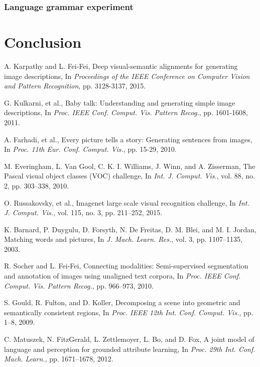 \documentclass[10pt,twocolumn,letterpaper]{article}
\begin{document}
\subsubsection{Language grammar experiment} \label{sec:lg}





\section{Conclusion}


\begin{thebibliography}{99}
A. Karpathy and L. Fei-Fei, Deep visual-semantic alignments for generating image descriptions,
In \textit{Proceedings of the IEEE Conference on Computer Vision and Pattern Recognition}, pp. 3128-3137, 2015.

G. Kulkarni, et al., Baby talk: Understanding and generating simple image descriptions,
In \textit{Proc. IEEE Conf. Comput. Vis. Pattern Recog.}, pp. 1601-1608, 2011.

A. Farhadi, et al., Every picture tells a story: Generating sentences from images,
In \textit{Proc. 11th Eur. Conf. Comput. Vis.}, pp. 15-29, 2010.

M. Everingham, L. Van Gool, C. K. I. Williams, J. Winn, and A. Zisserman, The Pascal visual object classes (VOC) challenge,
In \textit{Int. J. Comput. Vis.}, vol. 88, no. 2, pp. 303–338, 2010.

O. Russakovsky, et al., Imagenet large scale visual recognition challenge,
In \textit{Int. J. Comput. Vis.}, vol. 115, no. 3, pp. 211–252, 2015.

K. Barnard, P. Duygulu, D. Forsyth, N. De Freitas, D. M. Blei, and M. I. Jordan, Matching words and pictures,
In \textit{J. Mach. Learn. Res.}, vol. 3, pp. 1107–1135, 2003.

R. Socher and L. Fei-Fei, Connecting modalities: Semi-supervised segmentation and annotation of images using unaligned text corpora,
In \textit{Proc. IEEE Conf. Comput. Vis. Pattern Recog.}, pp. 966–973, 2010.

S. Gould, R. Fulton, and D. Koller, Decomposing a scene into geometric and semantically consistent regions,
In \textit{Proc. IEEE 12th Int. Conf. Comput. Vis.}, pp. 1–8, 2009.

C. Matuszek, N. FitzGerald, L. Zettlemoyer, L. Bo, and D. Fox, A joint model of language and perception for grounded attribute learning,
In \textit{Proc. 29th Int. Conf. Mach. Learn.}, pp. 1671–1678, 2012.


\end{thebibliography}
\end{document}
